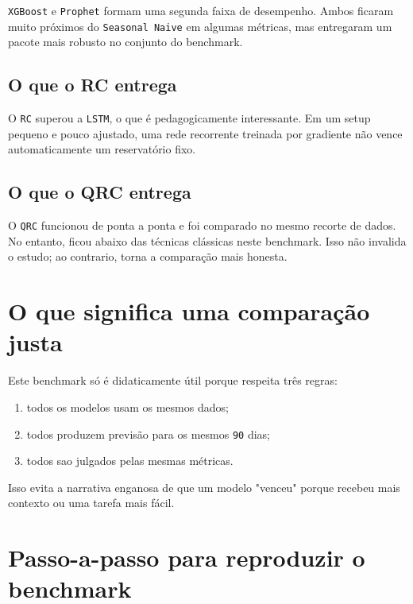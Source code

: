 \documentclass[12pt]{article}
\providecommand{\tightlist}{%
          \setlength{\itemsep}{0pt}\setlength{\parskip}{0pt}}
\begin{document}
\texttt{XGBoost} e \texttt{Prophet} formam uma segunda faixa de desempenho. Ambos ficaram muito próximos do \texttt{Seasonal\ Naive} em algumas métricas, mas entregaram um pacote mais robusto no conjunto do benchmark.

\subsection{O que o RC entrega}\label{63-o-que-o-rc-entrega}

O \texttt{RC} superou a \texttt{LSTM}, o que é pedagogicamente interessante. Em um setup pequeno e pouco ajustado, uma rede recorrente treinada por gradiente não vence automaticamente um reservatório fixo.

\subsection{O que o QRC entrega}\label{64-o-que-o-qrc-entrega}

O \texttt{QRC} funcionou de ponta a ponta e foi comparado no mesmo recorte de dados. No entanto, ficou abaixo das técnicas clássicas neste benchmark. Isso não invalida o estudo; ao contrario, torna a comparação mais honesta.

\section{O que significa uma comparação justa}\label{7-o-que-significa-uma-comparauxe7uxe3o-justa}

Este benchmark só é didaticamente útil porque respeita três regras:

\begin{enumerate}
\def\labelenumi{\arabic{enumi}.}
\tightlist
\item
  todos os modelos usam os mesmos dados;
\item
  todos produzem previsão para os mesmos \texttt{90} dias;
\item
  todos sao julgados pelas mesmas métricas.
\end{enumerate}

Isso evita a narrativa enganosa de que um modelo "venceu" porque recebeu mais contexto ou uma tarefa mais fácil.

\section{Passo-a-passo para reproduzir o benchmark}\label{8-passo-a-passo-para-reproduzir-o-benchmark}
\end{document}
